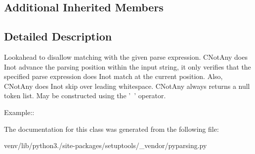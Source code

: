 \subsection*{Additional Inherited Members}


\subsection{Detailed Description}
\begin{DoxyVerb}Lookahead to disallow matching with the given parse expression.  C{NotAny}
does I{not} advance the parsing position within the input string, it only
verifies that the specified parse expression does I{not} match at the current
position.  Also, C{NotAny} does I{not} skip over leading whitespace. C{NotAny}
always returns a null token list.  May be constructed using the '~' operator.

Example::\end{DoxyVerb}
 

The documentation for this class was generated from the following file\+:\begin{DoxyCompactItemize}
\item 
venv/lib/python3./site-\/packages/setuptools/\+\_\+vendor/pyparsing.\+py\end{DoxyCompactItemize}
